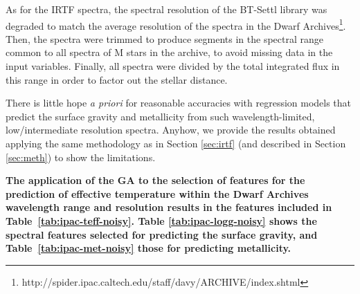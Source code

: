 
As for the IRTF spectra, the spectral resolution of the BT-Settl
library was degraded to match the average resolution of the spectra in
the Dwarf
Archives\footnote{http://spider.ipac.caltech.edu/staff/davy/ARCHIVE/index.shtml}. Then,
the spectra were trimmed to produce segments in the spectral range
common to all spectra of M stars in the archive, to avoid missing data
in the input variables. Finally, all spectra were divided by the total
integrated flux in this range in order to factor out the stellar
distance.

There is little hope {\it a priori} for reasonable accuracies with
regression models that predict the surface gravity and metallicity
from such wavelength-limited, low/intermediate resolution
spectra. Anyhow, we provide the results obtained applying the same
methodology as in Section \ref{sec:irtf} (and described in
Section \ref{sec:meth}) to show the limitations.

{\bf The application of the GA to the selection of features for the
prediction of effective temperature within the Dwarf Archives
wavelength range and resolution results in the features included in
Table~\ref{tab:ipac-teff-noisy}. Table \ref{tab:ipac-logg-noisy} shows
the spectral features selected for predicting the surface gravity, and
Table~\ref{tab:ipac-met-noisy} those for predicting metallicity.} 

